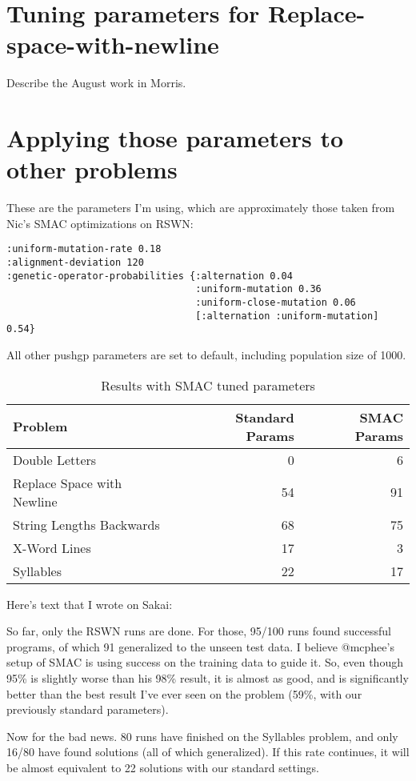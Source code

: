 \documentclass{llncs}
\begin{document}
\section{Tuning parameters for Replace-space-with-newline}

Describe the August work in Morris.

\section{Applying those parameters to other problems}

These are the parameters I'm using, which are approximately those taken from Nic's SMAC optimizations on RSWN:

\begin{verbatim}
:uniform-mutation-rate 0.18
:alignment-deviation 120
:genetic-operator-probabilities {:alternation 0.04
                                 :uniform-mutation 0.36
                                 :uniform-close-mutation 0.06
                                 [:alternation :uniform-mutation] 0.54}
\end{verbatim}

All other pushgp parameters are set to default, including population size of 1000.

\begin{table}[t]
\centering
\caption{Results with SMAC tuned parameters}
\label{table:results}
\begin{tabular}{l r r}
\toprule
\textbf{Problem} & \textbf{Standard Params} & \textbf{SMAC Params} \tabularnewline
\midrule
Double Letters	& 0 & 6 \tabularnewline
Replace Space with Newline & 54 & 91 \tabularnewline
String Lengths Backwards & 68 & 75 \tabularnewline
X-Word Lines & 17 & 3 \tabularnewline
Syllables & 22 & 17 \tabularnewline
\bottomrule
\end{tabular}
\end{table}

Here's text that I wrote on Sakai:

So far, only the RSWN runs are done. For those, 95/100 runs found successful programs, of which 91 generalized to the unseen test data. I believe @mcphee's setup of SMAC is using success on the training data to guide it. So, even though 95\% is slightly worse than his 98\% result, it is almost as good, and is significantly better than the best result I've ever seen on the problem (59\%, with our previously standard parameters).

Now for the bad news. 80 runs have finished on the Syllables problem, and only 16/80 have found solutions (all of which generalized). If this rate continues, it will be almost equivalent to 22 solutions with our standard settings.
\end{document}
